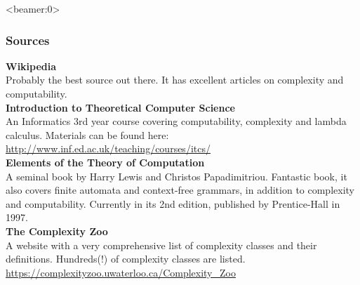 \documentclass[handout, 12pt]{beamer}
\begin{document}
\begin{frame}<beamer:0>

\frametitle{Sources}

\footnotesize
\textbf{Wikipedia}\\
Probably the best source out there. It has excellent articles on complexity and computability.
\\[0.6em]
\textbf{Introduction to Theoretical Computer Science}\\
An Informatics 3rd year course covering computability, complexity and lambda calculus. Materials can be found here:\\ \url{http://www.inf.ed.ac.uk/teaching/courses/itcs/}
\\[0.6em]
\textbf{Elements of the Theory of Computation}\\
A seminal book by Harry Lewis and Christos Papadimitriou. Fantastic book, it also covers finite automata and context-free grammars, in addition to complexity and computability. Currently in its 2nd edition, published by Prentice-Hall in 1997.
\\[0.6em]
\textbf{The Complexity Zoo}\\
A website with a very comprehensive list of complexity classes and their definitions. Hundreds(!) of complexity classes are listed.\\
\url{https://complexityzoo.uwaterloo.ca/Complexity_Zoo}

\end{frame}
\end{document}
